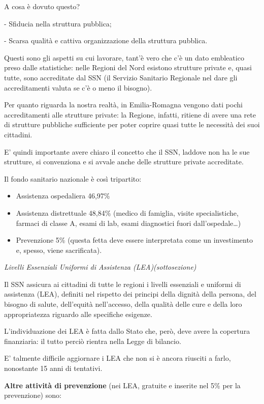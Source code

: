 \documentclass[]{article}
\begin{document}
A cosa è dovuto questo?

- Sfiducia nella struttura pubblica;

- Scarsa qualità e cattiva organizzazione della struttura pubblica.

Questi sono gli aspetti su cui lavorare, tant'è vero che c'è un dato
embleatico preso dalle statistiche: nelle Regioni del Nord esistono
strutture private e, quasi tutte, sono accreditate dal SSN (il Servizio
Sanitario Regionale nel dare gli accreditamenti valuta se c'è o meno il
bisogno).

Per quanto riguarda la nostra realtà, in Emilia-Romagna vengono dati
pochi accreditamenti alle strutture private: la Regione, infatti,
ritiene di avere una rete di strutture pubbliche sufficiente per poter
coprire quasi tutte le necessità dei suoi cittadini.

E' quindi importante avere chiaro il concetto che il SSN, laddove non ha
le sue strutture, si convenziona e si avvale anche delle strutture
private accreditate.

Il fondo sanitario nazionale è così tripartito:

\begin{itemize}
\item
  Assistenza ospedaliera 46,97\%
\item
  Assistenza distrettuale 48,84\% (medico di famiglia, visite
  specialistiche, farmaci di classe A, esami di lab, esami diagnostici
  fuori dall'ospedale\ldots{})
\item
  Prevenzione 5\% (questa fetta deve essere interpretata come un
  investimento e, spesso, viene sacrificata).
\end{itemize}

\emph{Livelli Essenziali Uniformi di Assistenza (LEA)(sottosezione)}

Il SSN assicura ai cittadini di tutte le regioni i livelli essenziali e
uniformi di assistenza (LEA), definiti nel rispetto dei principi della
dignità della persona, del bisogno di salute, dell'equità nell'accesso,
della qualità delle cure e della loro appropriatezza riguardo alle
specifiche esigenze.

L'individuazione dei LEA è fatta dallo Stato che, però, deve avere la
copertura finanziaria: il tutto perciò rientra nella Legge di bilancio.

E' talmente difficile aggiornare i LEA che non si è ancora riusciti a
farlo, nonostante 15 anni di tentativi.

\textbf{Altre attività di prevenzione} (nei LEA, gratuite e inserite nel
5\% per la prevenzione) sono:
\end{document}
